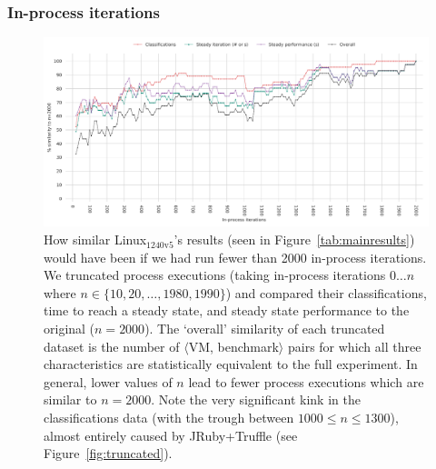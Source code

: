 \documentclass[acmsmall,screen]{acmart}
\newcommand{\bencherseven}{Linux$_\mathrm{1240v5}$\xspace}
\newcommand{\vmbpair}{$\langle$VM, benchmark$\rangle$\xspace}
\newcommand{\numiterations}{2000\xspace}
\begin{document}
\subsubsection{In-process iterations}

\begin{figure}[!tbp]
\centering
\includegraphics[width=\textwidth]{examples/truncated_same_plot.pdf}
\caption{How similar \bencherseven's results (seen in Figure~\ref{tab:mainresults})
would have been if we had run fewer than
\numiterations in-process iterations. We truncated process executions (taking in-process
iterations $0 \ldots n$ where $n \in \{10, 20, \ldots, 1980, 1990\}$) and compared
their classifications, time to reach a steady state, and steady state
performance to the original ($n=2000$). The `overall' similarity of each truncated
dataset is the number of \vmbpair pairs for which all three characteristics are statistically
equivalent to the full experiment.
In general, lower values of $n$ lead to fewer process executions
which are similar to $n=2000$. Note the very significant kink in the
classifications data (with the trough between $1000 \leq n \leq 1300$), almost
entirely caused by JRuby+Truffle (see Figure~\ref{fig:truncated}).}
\label{fig:sametruncated}
\end{figure}
\end{document}
